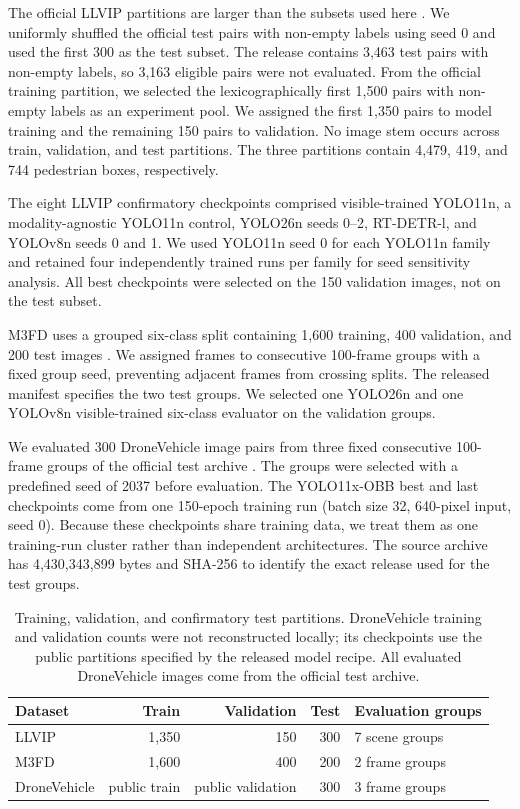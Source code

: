 \documentclass[preprint,11pt]{elsarticle}
\begin{document}
The official LLVIP partitions are larger than the subsets used here
\cite{jia2021}. We uniformly shuffled the official test pairs with non-empty
labels using seed 0 and used the first 300 as the test subset. The release
contains 3,463 test pairs with non-empty labels, so 3,163 eligible pairs were
not evaluated. From the official training partition, we selected the
lexicographically first 1,500 pairs with non-empty labels as an experiment
pool. We assigned the first 1,350 pairs to model training and the remaining 150
pairs to validation. No image stem occurs across train, validation, and test
partitions. The three partitions contain 4,479, 419, and 744 pedestrian boxes,
respectively.

The eight LLVIP confirmatory checkpoints comprised visible-trained YOLO11n, a
modality-agnostic YOLO11n control, YOLO26n seeds 0--2, RT-DETR-l, and YOLOv8n
seeds 0 and 1. We used YOLO11n seed 0 for each YOLO11n family and retained four
independently trained runs per family for seed sensitivity analysis. All best
checkpoints were selected on the 150 validation images, not on the test subset.

M3FD uses a grouped six-class split containing 1,600 training, 400 validation,
and 200 test images \cite{liu2022}. We assigned frames to consecutive 100-frame
groups with a fixed group seed, preventing adjacent frames from crossing splits.
The released manifest specifies the two test groups. We selected one YOLO26n and
one YOLOv8n visible-trained six-class evaluator on the validation groups.

We evaluated 300 DroneVehicle image pairs from three fixed consecutive 100-frame
groups of the official test archive \cite{sun2022}. The groups were selected
with a predefined seed of 2037 before evaluation. The YOLO11x-OBB best and last
checkpoints come from one 150-epoch training run (batch size 32, 640-pixel input,
seed 0). Because these checkpoints share training data, we treat them as one
training-run cluster rather than independent architectures. The source archive
has 4,430,343,899 bytes and SHA-256
\texttt{}
to identify the exact release used for the test groups.

\begin{table}[t]
\centering
\small
\caption{Training, validation, and confirmatory test partitions. DroneVehicle
training and validation counts were not reconstructed locally; its checkpoints
use the public partitions specified by the released model recipe. All evaluated
DroneVehicle images come from the official test archive.}
\label{tab:data}
\begin{tabular}{@{}lrrrl@{}}
\toprule
Dataset & Train & Validation & Test & Evaluation groups \\
\midrule
LLVIP & 1,350 & 150 & 300 & 7 scene groups \\
M3FD & 1,600 & 400 & 200 & 2 frame groups \\
DroneVehicle & public train & public validation & 300 & 3 frame groups \\
\bottomrule
\end{tabular}
\end{table}
\end{document}
